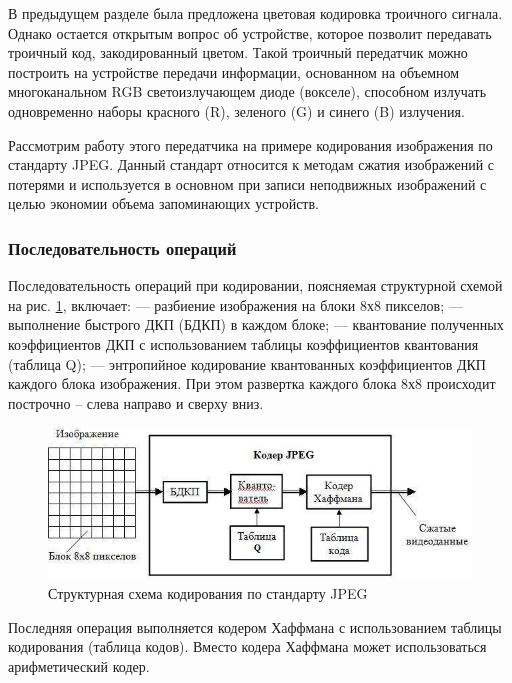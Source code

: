 \documentclass[10pt]{beamer}
\begin{document}
\begin{frame}[shrink=20,fragile]
\transdissolve[duration=0.2]
\begin{block}{}
	В предыдущем разделе была предложена цветовая кодировка троичного сигнала. Однако остается открытым вопрос об устройстве, которое позволит передавать троичный код, закодированный цветом. Такой троичный передатчик можно построить на устройстве передачи информации, основанном на объемном многоканальном RGB светоизлучающем диоде (вокселе), способном излучать одновременно наборы красного (R), зеленого (G) и синего (B) излучения.
	
	Рассмотрим работу этого передатчика на примере кодирования изображения по стандарту JPEG. Данный стандарт относится к методам сжатия изображений с потерями и используется в основном при записи неподвижных изображений с целью экономии объема запоминающих устройств.
\end{block}   
\end{frame}

\subsubsection{Последовательность операций}

\begin{frame}[shrink=20,fragile]
\transdissolve[duration=0.2]
Последовательность операций при кодировании, поясняемая структурной схемой на рис. \ref{fig4}, включает:
—	разбиение изображения на блоки 8х8 пикселов;
—	выполнение быстрого ДКП (БДКП) в каждом блоке;
—	квантование полученных коэффициентов ДКП с использованием таблицы коэффициентов квантования (таблица Q);
—	энтропийное кодирование квантованных коэффициентов ДКП каждого блока изображения.
При этом развертка каждого блока 8х8 происходит построчно – слева направо и сверху вниз.
\begin{block}{}
\begin{figure}
\label{fig4}
\includegraphics[scale=0.85]{pics/4.jpeg}
\caption{Структурная схема кодирования по стандарту JPEG}
\end{figure}
	Последняя операция выполняется кодером Хаффмана с использованием таблицы кодирования (таблица кодов). Вместо кодера Хаффмана может использоваться арифметический кодер.
\end{block}   
\end{frame}
\end{document}
